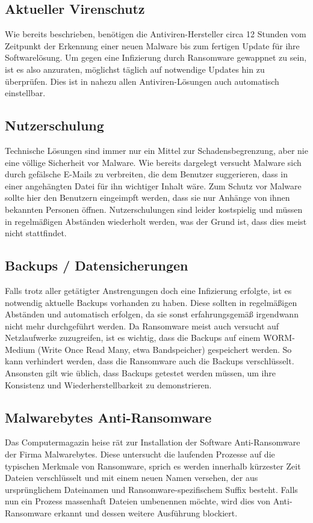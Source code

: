 \subsection{Aktueller Virenschutz}

	Wie bereits beschrieben, benötigen die Antiviren-Hersteller circa 12 Stunden vom Zeitpunkt der Erkennung einer neuen Malware bis zum fertigen Update für ihre Softwarelösung. Um gegen eine Infizierung durch Ransomware gewappnet zu sein, ist es also anzuraten, möglichst täglich auf notwendige Updates hin zu überprüfen. Dies ist in nahezu allen Antiviren-Lösungen auch automatisch einstellbar.

\subsection{Nutzerschulung}

	Technische Lösungen sind immer nur ein Mittel zur Schadensbegrenzung, aber nie eine völlige Sicherheit vor Malware. Wie bereits dargelegt versucht Malware sich durch gefälsche E-Mails zu verbreiten, die dem Benutzer suggerieren, dass in einer angehängten Datei für ihn wichtiger Inhalt wäre. Zum Schutz vor Malware sollte hier den Benutzern eingeimpft werden, dass sie nur Anhänge von ihnen bekannten Personen öffnen. Nutzerschulungen sind leider kostspielig und müssen in regelmäßigen Abständen wiederholt werden, was der Grund ist, dass dies meist nicht stattfindet.


\subsection{Backups / Datensicherungen}

	Falls trotz aller getätigter Anstrengungen doch eine Infizierung erfolgte, ist es notwendig aktuelle Backups vorhanden zu haben. Diese sollten in regelmäßigen Abständen und automatisch erfolgen, da sie sonst erfahrungsgemäß irgendwann nicht mehr durchgeführt werden. Da Ransomware meist auch versucht auf Netzlaufwerke zuzugreifen, ist es wichtig, dass die Backups auf einem WORM-Medium (Write Once Read Many, etwa Bandspeicher) gespeichert werden. So kann verhindert werden, dass die Ransomware auch die Backups verschlüsselt.\\
	Ansonsten gilt wie üblich, dass Backups getestet werden müssen, um ihre Konsistenz und Wiederherstellbarkeit zu demonstrieren.
	
\subsection{Malwarebytes Anti-Ransomware}

	Das Computermagazin \glqq heise\grqq{} rät zur Installation der Software \glqq Anti-Ransomware\grqq{} der Firma Malwarebytes. Diese untersucht die laufenden Prozesse auf die typischen Merkmale von Ransomware, sprich es werden innerhalb kürzester Zeit Dateien verschlüsselt und mit einem neuen Namen versehen, der aus ursprünglichem Dateinamen und Ransomware-spezifischem Suffix besteht. Falls nun ein Prozess massenhaft Dateien umbenennen möchte, wird dies von \glqq Anti-Ransomware\glqq{} erkannt und dessen weitere Ausführung blockiert\cite{malwarebytes}.

